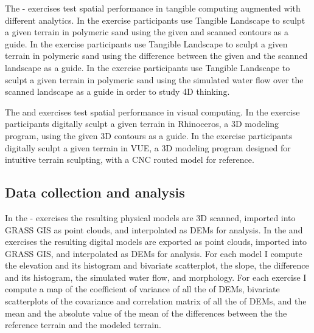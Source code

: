 \documentclass{sigchi}
\begin{document}
The - exercises test spatial performance 
in tangible computing augmented with different analytics.
In the  exercise participants use Tangible Landscape to 
sculpt a given terrain in polymeric sand 
using the given and scanned contours as a guide. 
In the  exercise participants use Tangible Landscape to 
sculpt a given terrain in polymeric sand 
using the difference between the given 
and the scanned landscape as a guide. 
In the  exercise participants use Tangible Landscape to 
sculpt a given terrain in polymeric sand 
using the simulated water flow 
over the scanned landscape
as a guide 
in order to study 4D thinking.

The  and  exercises test spatial performance in visual computing.
In the  exercise 
participants digitally sculpt a given terrain in Rhinoceros, 
a 3D modeling program, 
using the given 3D contours as a guide. 
In the  exercise 
participants digitally sculpt a given terrain in VUE,
a 3D modeling program
designed for intuitive terrain sculpting, 
with a CNC routed model for reference. 

\subsection{Data collection and analysis}
In the - exercises the resulting physical models are 3D scanned, 
imported into GRASS GIS as point clouds, and 
interpolated as DEMs for analysis. 
In the  and  exercises the resulting digital models are 
exported as point clouds, imported into GRASS GIS, 
and interpolated as DEMs for analysis. 
For each model I compute the elevation and its histogram 
and bivariate scatterplot, the slope, the difference and its histogram, 
the simulated water flow, and morphology. 
For each exercise I compute 
a map of the coefficient of variance of all the of DEMs,
bivariate scatterplots of
the covariance and correlation matrix of all the of DEMs,
and the mean and the absolute value of the mean of the 
differences between the the reference terrain and the modeled terrain.
\end{document}
